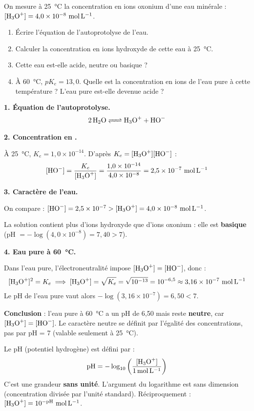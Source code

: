 \documentclass[11pt]{article}
\newcommand{\cle}[1]{{\popxbold\color{popdark}#1}}
\newcounter{popsec}
\newcounter{popsub}
\newcommand{\courssub}[1]{%
  \stepcounter{popsub}%
  \par\vspace{9pt}\noindent{\popxbold\fontsize{11.5}{13}\selectfont\color{popink}{\color{poporange}\thepopsec.\thepopsub}\hspace{6pt}#1}\par\nopagebreak\vspace{4pt}
}
\begin{document}
\begin{exoresolu}
On mesure à \SI{25}{\celsius} la concentration en ions oxonium d'une eau minérale : $[\ce{H3O+}] = 4{,}0 \times 10^{-8}\ \si{mol.L^{-1}}$.
\begin{enumerate}
\item Écrire l'équation de l'autoprotolyse de l'eau.
\item Calculer la concentration en ions hydroxyde de cette eau à \SI{25}{\celsius}.
\item Cette eau est-elle acide, neutre ou basique ?
\item À \SI{60}{\celsius}, $pK_e = 13{,}0$. Quelle est la concentration en ions  de l'eau pure à cette température ? L'eau pure est-elle devenue acide ?
\end{enumerate}
\tcblower
\textbf{1. Équation de l'autoprotolyse.}
\[ \ce{2 H2O <=> H3O+ + HO-} \]

\textbf{2. Concentration en .}

À \SI{25}{\celsius}, $K_e = 1{,}0 \times 10^{-14}$. D'après $K_e = [\ce{H3O+}][\ce{HO-}]$ :
\[ [\ce{HO-}] = \frac{K_e}{[\ce{H3O+}]} = \frac{1{,}0 \times 10^{-14}}{4{,}0 \times 10^{-8}} = 2{,}5 \times 10^{-7}\ \si{mol.L^{-1}} \]

\textbf{3. Caractère de l'eau.}

On compare : $[\ce{HO-}] = 2{,}5 \times 10^{-7} > [\ce{H3O+}] = 4{,}0 \times 10^{-8}\ \si{mol.L^{-1}}$.

La solution contient plus d'ions hydroxyde que d'ions oxonium : elle est \textbf{basique} (pH $= -\log(4{,}0 \times 10^{-8}) = 7{,}40 > 7$).

\textbf{4. Eau pure à \SI{60}{\celsius}.}

Dans l'eau pure, l'électroneutralité impose $[\ce{H3O+}] = [\ce{HO-}]$, donc :
\[ [\ce{H3O+}]^2 = K_e \implies [\ce{H3O+}] = \sqrt{K_e} = \sqrt{10^{-13}} = 10^{-6{,}5} \approx 3{,}16 \times 10^{-7}\ \si{mol.L^{-1}} \]
Le pH de l'eau pure vaut alors $-\log(3{,}16 \times 10^{-7}) = 6{,}50 < 7$.

\textbf{Conclusion} : l'eau pure à \SI{60}{\celsius} a un pH de 6,50 mais reste \textbf{neutre}, car $[\ce{H3O+}] = [\ce{HO-}]$. Le caractère neutre se définit par l'égalité des concentrations, pas par pH = 7 (valable seulement à \SI{25}{\celsius}).
\end{exoresolu}

\courssub{Le pH : définition et mesure}

\begin{definition}
Le \cle{pH} (potentiel hydrogène) est défini par :
\[ \text{pH} = -\log_{10}\left( \frac{[\ce{H3O+}]}{\SI{1}{mol.L^{-1}}} \right) \]
C'est une grandeur \textbf{sans unité}. L'argument du logarithme est sans dimension (concentration divisée par l'unité standard).
Réciproquement : $[\ce{H3O+}] = 10^{-\text{pH}}\ \si{mol.L^{-1}}$.
\end{definition}
\end{document}
